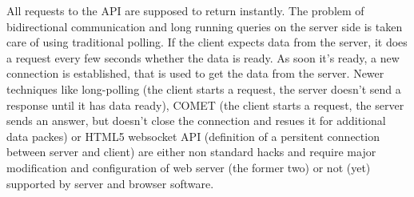 

All requests to the API are supposed to return instantly.
The problem of bidirectional communication and long running queries on the server side is taken care of using traditional polling.
If the client expects data from the server, it does a request every few seconds whether the data is ready.
As soon it's ready, a new connection is established, that is used to get the data from the server.
Newer techniques like long-polling (the client starts a request, the server doesn't send a response until it has data ready), COMET (the client starts a request, the server sends an answer, but doesn't close the connection and resues it for additional data packes) or HTML5 websocket API (definition of a persitent connection between server and client) are either non standard hacks and require major modification and configuration of web server (the former two) or not (yet) supported by server and browser software.


